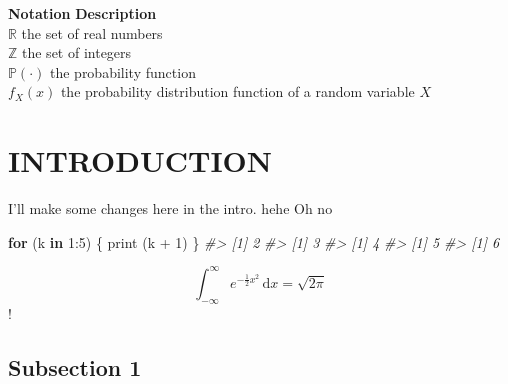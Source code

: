 \documentclass{source/tex/templates/maththesis}
\newenvironment{Shaded}{\begin{snugshade}}{\end{snugshade}}
\newcommand{\CommentTok}[1]{\textcolor[rgb]{0.56,0.35,0.01}{\textit{#1}}}
\newcommand{\ControlFlowTok}[1]{\textcolor[rgb]{0.13,0.29,0.53}{\textbf{#1}}}
\newcommand{\DecValTok}[1]{\textcolor[rgb]{0.00,0.00,0.81}{#1}}
\newcommand{\FunctionTok}[1]{\textcolor[rgb]{0.00,0.00,0.00}{#1}}
\newcommand{\NormalTok}[1]{#1}
\newcommand{\SpecialCharTok}[1]{\textcolor[rgb]{0.00,0.00,0.00}{#1}}
\begin{document}
\begin{tabbing}

\hspace{0.25in} \={\bf Notation} \hspace{0.5in}\={\bf Description}\\ 
\>$\mathbb{R}$ \>the set of real numbers \\
\>$\mathbb{Z}$ \>the set of integers \\
\>$\mathbb{P}(\cdot)$ \>the probability function \\
\>$f_X(x)$ \>the probability distribution function of a random variable $X$ \\

\end{tabbing}

\listoffigures\newpage
{}

\listoftables\newpage
{}

\hypertarget{introduction}{%
\chapter{INTRODUCTION}\label{introduction}}

I'll make some changes here in the intro. hehe Oh no

\begin{Shaded}
\begin{Highlighting}[]
\ControlFlowTok{for}\NormalTok{ (k }\ControlFlowTok{in} \DecValTok{1}\SpecialCharTok{:}\DecValTok{5}\NormalTok{) \{}
  \FunctionTok{print}\NormalTok{ (k }\SpecialCharTok{+} \DecValTok{1}\NormalTok{)}
\NormalTok{\}}
\CommentTok{\#\textgreater{} [1] 2}
\CommentTok{\#\textgreater{} [1] 3}
\CommentTok{\#\textgreater{} [1] 4}
\CommentTok{\#\textgreater{} [1] 5}
\CommentTok{\#\textgreater{} [1] 6}
\end{Highlighting}
\end{Shaded}

\[
 \int_{-\infty}^{\infty} e^{-\frac{1}{2}x^2}\,\text{d}x = \sqrt{2\pi}
\]!

\hypertarget{subsection-1}{%
\section{Subsection 1}\label{subsection-1}}
\end{document}
